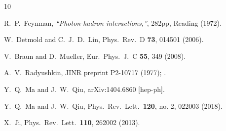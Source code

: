 \documentclass[aps,prd,twocolumn,showpacs,preprintnumbers,superscriptaddress]{revtex4-1}
\begin{document}
 
 \begin{thebibliography}{10}
 
 

 


  R.~P.~Feynman,
  {\it ``Photon-hadron interactions,''}, 282pp, 
  Reading (1972).
  

 




  W.~Detmold and C.~J.~D.~Lin,
  Phys.\ Rev.\ D {\bf 73}, 014501 (2006).


  V.~Braun and D.~Mueller,
  Eur.\ Phys.\ J.\ C {\bf 55}, 349 (2008).



  A.~V.~Radyushkin,
JINR preprint P2-10717 (1977); \newline
  [hep-ph/0410276].

  Y.~Q.~Ma and J.~W.~Qiu,
  arXiv:1404.6860 [hep-ph].


  Y.~Q.~Ma and J.~W.~Qiu,
  Phys.\ Rev.\ Lett.\  {\bf 120}, no. 2, 022003 (2018).


  X.~Ji,
  Phys.\ Rev.\ Lett.\  {\bf 110}, 262002 (2013).



\end{thebibliography}
\end{document}
